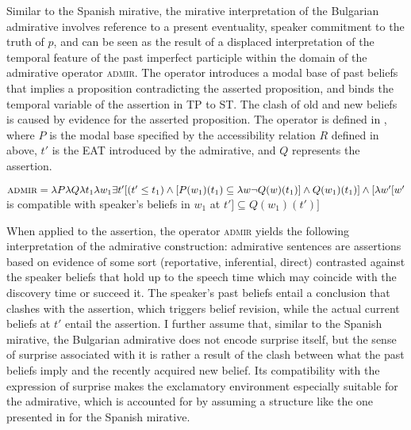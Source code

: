 \documentclass[output=paper,
colorlinks,
citecolor=brown,
newtxmath
]{langscibook}
\begin{document}
Similar to the Spanish mirative, the mirative interpretation of the Bulgarian admirative involves reference to a present eventuality, speaker commitment to the truth of $p$, and can be seen as the result of a displaced interpretation of the temporal feature of the past imperfect participle within the domain of the admirative operator \textsc{admir}. The operator introduces a modal base of past beliefs that implies a proposition contradicting the asserted proposition, and binds the temporal variable of the assertion in TP to ST.
The clash of old and new beliefs is caused by evidence for the asserted proposition.
The operator is defined in , where $P$ is the modal base specified by the accessibility relation $R$ defined in  above,
$t'$ is the EAT introduced by the admirative, and $Q$ represents the assertion.

\ea\label{def:admir}
$\textsc{admir} = \lambda P \lambda Q \lambda t_1 \lambda w_1 \exists t' [ (t' \leq t_1 ) \wedge [ P(w_1)(t_1) \subseteq \lambda w \neg Q(w)(t_1)] \wedge Q(w_1)(t_1)] \\ \wedge [\lambda w'[ w'$ is compatible with speaker's beliefs in $w_1$ at $t'] \subseteq Q(w_1)(t')]$
\z

\noindent When applied to the assertion, the operator \textsc{admir} yields the following interpretation of the admirative construction: admirative sentences are assertions based on evidence of some sort (reportative, inferential, direct) contrasted against the speaker beliefs that hold up to the speech time which may coincide with the discovery time or succeed it.
The speaker's past beliefs entail a conclusion that clashes with the assertion, which triggers belief revision, while the actual current beliefs at $t'$ entail the assertion.
I further assume that, similar to the Spanish mirative, the Bulgarian admirative does not encode surprise itself, but the sense of surprise associated with it is rather a result of the clash between what the past beliefs imply and the recently acquired new belief. Its compatibility with the expression of surprise makes the exclamatory environment especially suitable for the admirative, which is accounted for by assuming a structure like the one presented in  for the Spanish mirative.
\end{document}
